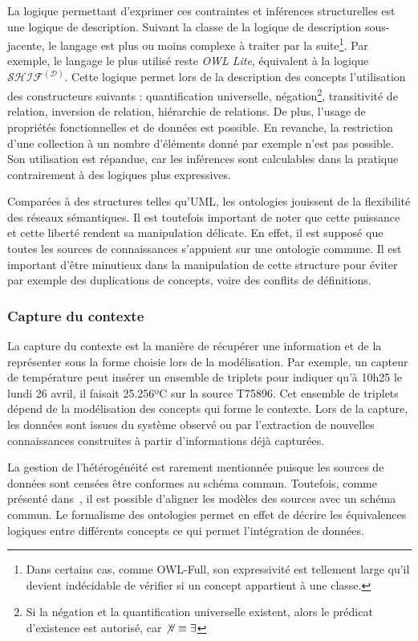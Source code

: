 La logique permettant d'exprimer ces contraintes et inférences structurelles est une logique de description. Suivant la classe de la logique de description sous-jacente, le langage est plus ou moins complexe à traiter par la suite\footnote{Dans certains cas, comme OWL-Full, son expressivité est tellement large qu'il devient indécidable de vérifier si un concept appartient à une classe.}. Par exemple, le langage le plus utilisé reste \textit{OWL Lite}, équivalent à la logique $\mathcal{SHIF}^\mathcal{(D)}$. Cette logique permet lors de la description des concepts l'utilisation des constructeurs suivants : quantification universelle, négation\footnote{Si la négation et la quantification universelle existent, alors le prédicat d'existence est autorisé, car $\not\forall \equiv \exists$}, transitivité de relation, inversion de relation, hiérarchie de relations. De plus, l'usage de propriétés fonctionnelles et de données est possible. En revanche, la restriction d'une collection à un nombre d'éléments donné par exemple n'est pas possible. Son utilisation est répandue, car les inférences sont calculables dans la pratique contrairement à des logiques plus expressives.

Comparées à des structures telles qu'UML, les ontologies jouissent de la flexibilité des réseaux sémantiques. Il est toutefois important de noter que cette puissance et cette liberté rendent sa manipulation délicate. En effet, il est supposé que toutes les sources de connaissances s'appuient sur une ontologie commune. Il est important d'être minutieux dans la manipulation de cette structure pour éviter par exemple des duplications de concepts, voire des conflits de définitions.

\subsubsection{Capture du contexte}
La capture du contexte est la manière de récupérer une information et de la représenter sous la forme choisie lors de la modélisation. Par exemple, un capteur de température peut insérer un ensemble de triplets pour indiquer qu'à 10h25 le lundi 26 avril, il faisait 25.256ºC sur la source T75896. Cet ensemble de triplets dépend de la modélisation des concepts qui forme le contexte. Lors de la capture, les données sont issues du système observé ou par l'extraction de nouvelles connaissances construites à partir d'informations déjà capturées.

La gestion de l'hétérogénéité est rarement mentionnée puisque les sources de données sont censées être conformes au schéma commun. Toutefois, comme présenté dans~\cite{Kaed:these}, il est possible d'aligner les modèles des sources avec un schéma commun. Le formalisme des ontologies permet en effet de décrire les équivalences logiques entre différents concepts ce qui permet l'intégration de données.

